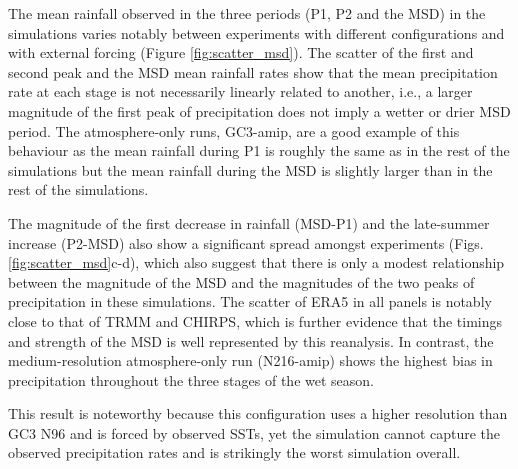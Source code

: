 The mean rainfall observed in the three periods (P1, P2 and the MSD) in the simulations varies notably between experiments with different configurations and with external forcing (Figure \ref{fig:scatter_msd}). 
 The scatter of the first and second peak and the MSD mean rainfall rates  show that the mean precipitation rate at each stage is not necessarily linearly related to another, i.e., a larger magnitude of the first peak of precipitation does not imply a wetter or drier MSD period. The atmosphere-only runs, GC3-amip, are a good example of this behaviour as the mean rainfall during P1 is roughly the same as in the rest of the simulations but the mean rainfall during the MSD is slightly larger than in the rest of the simulations. 
 

The magnitude of the first decrease in rainfall (MSD-P1) and the late-summer increase (P2-MSD) also show a significant spread amongst experiments (Figs. \ref{fig:scatter_msd}c-d), which also suggest that there is only a modest relationship between the magnitude of the MSD and the magnitudes of the two peaks of precipitation in these simulations. The scatter of ERA5 in all panels is notably close to that of TRMM and CHIRPS, which is further evidence that the timings and strength of the MSD is well represented by this reanalysis. In contrast, the medium-resolution atmosphere-only run (N216-amip) shows the highest bias in precipitation throughout the three stages of the wet season. 

This result is noteworthy because this configuration uses a higher resolution than GC3 N96 and is forced by observed SSTs, yet the simulation cannot capture the observed precipitation rates and is strikingly the worst simulation overall.


